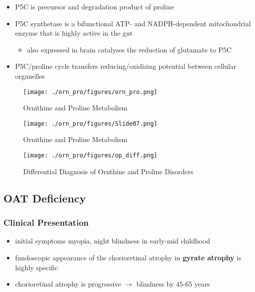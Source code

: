 \documentclass{scrartcl}
\begin{document}
\begin{itemize}
\begin{itemize}
\item {}
\end{itemize}
\item P5C is precursor and degradation product of proline
\item P5C synthetase is a bifunctional ATP- and NADPH-dependent
mitochondrial enzyme that is highly active in the gut
\begin{itemize}
\item also expressed in brain catalyses the reduction of glutamate to
P5C
\end{itemize}
\item P5C/proline cycle transfers reducing/oxidizing potential between
cellular organelles
\end{itemize}


\begin{figure}[htbp]
\centering
\texttt{[image: ./orn\_pro/figures/orn\_pro.png]}
\caption{\label{fig:org4a682cc}
Ornithine and Proline Metabolism}
\end{figure}

\begin{figure}[htbp]
\centering
\texttt{[image: ./orn\_pro/figures/Slide07.png]}
\caption{\label{fig:org8f759f4}
Ornithine and Proline Metabolism}
\end{figure}

\begin{figure}[htbp]
\centering
\texttt{[image: ./orn\_pro/figures/op\_diff.png]}
\caption{\label{fig:orgef51bcd}
Differential Diagnosis of Ornthine and Proline Disorders}
\end{figure}

\subsection{OAT Deficiency}
\label{sec:org1d1d232}
\subsubsection{Clinical Presentation}
\label{sec:orga57fc23}
\begin{itemize}
\item initial symptoms myopia, night blindness in early-mid childhood
\item fundoscopic appearance of the chorioretinal atrophy in \textbf{gyrate atrophy} is highly specific
\item chorioretinal atrophy is progressive \(\to\) blindness by 45-65 years
\end{itemize}
\end{document}
